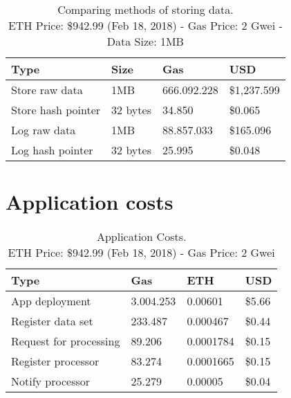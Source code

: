 \begin{table}[!ht]
  \centering
  \begin{tabular}{|l|l|l|l|}
    \hline
    Type & Size & Gas  & USD \\ \hline
    Store raw data & 1MB & 666.092.228  & \$1,237.599 \\ \hline
    Store hash pointer & 32 bytes & 34.850  & \$0.065 \\ \hline
    Log raw data & 1MB & 88.857.033  & \$165.096 \\ \hline
    Log hash pointer & 32 bytes & 25.995  & \$0.048 \\ \hline
  \end{tabular}
  \captionsetup{format=hang, justification=centering}
  \caption{Comparing methods of storing data.\\ ETH Price: \$942.99 (Feb 18, 2018) - Gas Price: 2 Gwei - Data Size: 1MB}
  \label{table:data_store_comparison_05}
\end{table}

\section{Application costs}
\label{evaluation:app_costs}

\begin{table}[!ht]
\centering
\begin{tabular}{|l|l|l|l|}
\hline
 Type & Gas & ETH & USD \\ \hline
 App deployment & 3.004.253 & 0.00601 & \$5.66 \\ \hline
 Register data set & 233.487 & 0.000467 & \$0.44 \\ \hline
 Request for processing & 89.206 & 0.0001784 & \$0.15 \\ \hline
 Register processor & 83.274 & 0.0001665 & \$0.15 \\ \hline
 Notify processor & 25.279 & 0.00005 & \$0.04 \\ \hline
\end{tabular}
\captionsetup{format=hang, justification=centering}
\caption{Application Costs.\\ ETH Price: \$942.99 (Feb 18, 2018) - Gas Price: 2 Gwei}
\label{table:app_costs}
\end{table}
